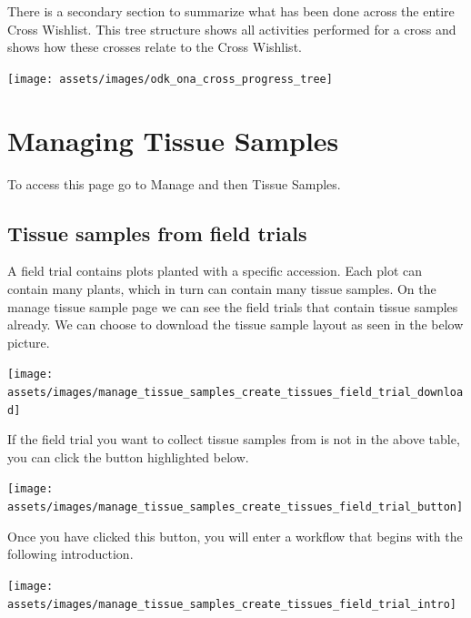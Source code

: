 \documentclass[
  12pt,
]{book}
\begin{document}
There is a secondary section to summarize what has been done across the entire Cross Wishlist. This tree structure shows all activities performed for a cross and shows how these crosses relate to the Cross Wishlist.

\begin{center}\texttt{[image: assets/images/odk\_ona\_cross\_progress\_tree]} \end{center}

\hypertarget{managing-tissue-samples}{%
\chapter{Managing Tissue Samples}\label{managing-tissue-samples}}

To access this page go to Manage and then Tissue Samples.

\hypertarget{tissue-samples-from-field-trials}{%
\section{Tissue samples from field trials}\label{tissue-samples-from-field-trials}}

A field trial contains plots planted with a specific accession. Each plot can contain many plants, which in turn can contain many tissue samples. On the manage tissue sample page we can see the field trials that contain tissue samples already. We can choose to download the tissue sample layout as seen in the below picture.

\begin{center}\texttt{[image: assets/images/manage\_tissue\_samples\_create\_tissues\_field\_trial\_download]} \end{center}

If the field trial you want to collect tissue samples from is not in the above table, you can click the button highlighted below.

\begin{center}\texttt{[image: assets/images/manage\_tissue\_samples\_create\_tissues\_field\_trial\_button]} \end{center}

Once you have clicked this button, you will enter a workflow that begins with the following introduction.

\begin{center}\texttt{[image: assets/images/manage\_tissue\_samples\_create\_tissues\_field\_trial\_intro]} \end{center}
\end{document}

